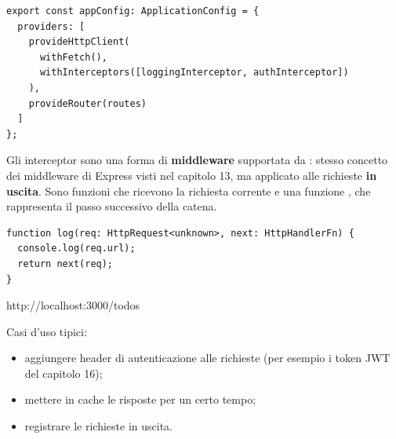 \begin{affianco}[0.52][c]
\codicepiccolo
\begin{lstlisting}[style=ts, name=app.config.ts]
export const appConfig: ApplicationConfig = {
  providers: [
    provideHttpClient(
      withFetch(),
      withInterceptors([loggingInterceptor, authInterceptor])
    ),
    provideRouter(routes)
  ]
};
\end{lstlisting}
\risultato
\begin{immagine}
\end{immagine}
\end{affianco}

Gli interceptor sono una forma di \textbf{middleware} supportata da
: stesso concetto dei middleware di Express visti nel capitolo
13, ma applicato alle richieste \textbf{in uscita}. Sono funzioni che ricevono
la richiesta corrente e una funzione , che rappresenta il passo
successivo della catena.

\begin{affianco}[0.62][c]
\codicepiccolo
\begin{lstlisting}[style=ts, name=interceptors.ts]
function log(req: HttpRequest<unknown>, next: HttpHandlerFn) {
  console.log(req.url);
  return next(req);
}
\end{lstlisting}
\risultato
\begin{console}
http://localhost:3000/todos
\end{console}
\end{affianco}

Casi d'uso tipici:

\begin{itemize}
  \item aggiungere header di autenticazione alle richieste (per esempio i token
        JWT del capitolo 16);
  \item mettere in cache le risposte per un certo tempo;
  \item registrare le richieste in uscita.
\end{itemize}

